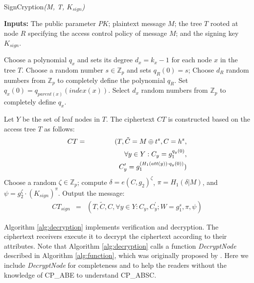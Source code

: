 \documentclass[letterpaper,12pt]{article}
\newenvironment{alginc}[1][pseudocode]{\medskip\algsetlanguage{#1}\begin{algorithmic}[1]}{\end{algorithmic}\medskip}
\begin{document}
\begin{algorithm}[htp]
\caption{SignCryption\emph{(M, T, $K_{sign}$)}}\label{alg:Encryption}
\small{\bf Inputs:} The public parameter $PK$; plaintext message $M$; the tree $T$ rooted at node $R$ specifying the access control policy of message $M$; and the signing key $K_{sign}$.
\begin{alginc}
\State Choose a polynomial $q_x$ and sets its degree $d_x=k_x-1$ for each node $x$ in the tree $T$.
\State Choose a random number $s\in \mathbb{Z}_p$ and sets $q_R(0)=s$;
\State Choose $d_R$ random numbers from $\mathbb{Z}_p$ to completely define the polynomial $q_R$.
  \State Set $q_x(0)=q_{parent(x)}(index (x))$.
  \State Select $d_x$ random numbers from $\mathbb{Z}_p$ to completely define $q_x$.
  \EndFor
\item Let $Y$ be the set of leaf nodes in $T$. The ciphertext $CT$ is constructed based on the access tree $T$ as follows:
\begin{eqnarray}
 CT&=& ( T, \tilde {C}=M\oplus t^{s}, C=h^s, \nonumber\\
 & & \forall y\in Y: C_y=g_1^{q_y(0)}, \nonumber\\
 & & \hspace{1.4cm} C_y^\prime=g_1^{(H_1(att(y))\cdot {q_y(0)})})
\end{eqnarray}
\State Choose a random $\zeta \in \mathbb{Z}_p$; compute $\delta=e(C,g_2)^\zeta$, $\pi=H_1(\delta|M)$, and $\psi=g_2^\zeta\cdot (K_{sign})^\pi$.
\State Output the message:
\begin{eqnarray}
 CT_{sign}&=& ( T, \tilde {C}, C, \forall y\in Y: C_y, C_y^\prime; W=g_1^s, \pi,\psi)\nonumber
\end{eqnarray}
\end{alginc}
\end{algorithm}


Algorithm \ref{alg:decryption} implements verification and decryption. The ciphertext receivers execute it to decrypt the ciphertext according to their attributes. Note that Algorithm \ref{alg:decryption}  calls a function \emph{DecryptNode} described in Algorithm \ref{alg:function}, which was originally proposed by \cite{bethencourt2007ciphertext}. Here we include \emph{DecryptNode} for completeness and to help the readers without the knowledge of CP\_ABE to understand CP\_ABSC.
\end{document}
